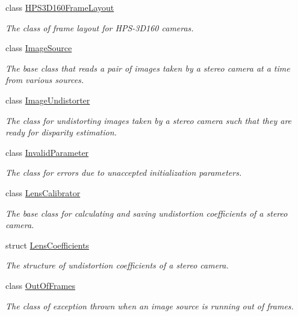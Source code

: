 \begin{DoxyCompactItemize}
class \hyperlink{classstereo__ugv_1_1HPS3D160FrameLayout}{H\+P\+S3\+D160\+Frame\+Layout}
\begin{DoxyCompactList}\small\item\em The class of frame layout for H\+P\+S-\/3\+D160 cameras. \end{DoxyCompactList}\item 
class \hyperlink{classstereo__ugv_1_1ImageSource}{Image\+Source}
\begin{DoxyCompactList}\small\item\em The base class that reads a pair of images taken by a stereo camera at a time from various sources. \end{DoxyCompactList}\item 
class \hyperlink{classstereo__ugv_1_1ImageUndistorter}{Image\+Undistorter}
\begin{DoxyCompactList}\small\item\em The class for undistorting images taken by a stereo camera such that they are ready for disparity estimation. \end{DoxyCompactList}\item 
class \hyperlink{classstereo__ugv_1_1InvalidParameter}{Invalid\+Parameter}
\begin{DoxyCompactList}\small\item\em The class for errors due to unaccepted initialization parameters. \end{DoxyCompactList}\item 
class \hyperlink{classstereo__ugv_1_1LensCalibrator}{Lens\+Calibrator}
\begin{DoxyCompactList}\small\item\em The base class for calculating and saving undistortion coefficients of a stereo camera. \end{DoxyCompactList}\item 
struct \hyperlink{structstereo__ugv_1_1LensCoefficients}{Lens\+Coefficients}
\begin{DoxyCompactList}\small\item\em The structure of undistortion coefficients of a stereo camera. \end{DoxyCompactList}\item 
class \hyperlink{classstereo__ugv_1_1OutOfFrames}{Out\+Of\+Frames}
\begin{DoxyCompactList}\small\item\em The class of exception thrown when an image source is running out of frames. \end{DoxyCompactList}\item 

\end{DoxyCompactItemize}
